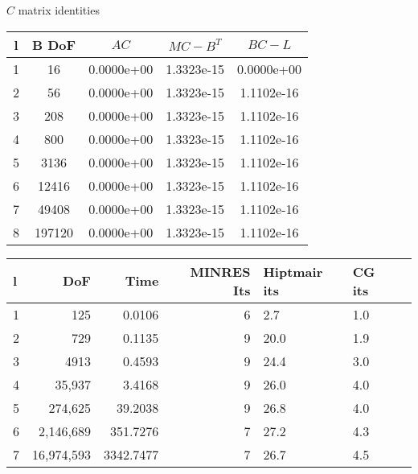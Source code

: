 \documentclass{article}
\begin{document}
$C$ matrix identities

\begin{tabular}{ccccc}
\hline
 l &   B DoF &        $AC$ &    $MC-B^T$ &      $BC-L$ \\
\hline
   1 &      16 &  0.0000e+00 &  1.3323e-15 &  0.0000e+00 \\
   2 &      56 &  0.0000e+00 &  1.3323e-15 &  1.1102e-16 \\
   3 &     208 &  0.0000e+00 &  1.3323e-15 &  1.1102e-16 \\
   4 &     800 &  0.0000e+00 &  1.3323e-15 &  1.1102e-16 \\
   5 &    3136 &  0.0000e+00 &  1.3323e-15 &  1.1102e-16 \\
   6 &   12416 &  0.0000e+00 &  1.3323e-15 &  1.1102e-16 \\
   7 &   49408 &  0.0000e+00 &  1.3323e-15 &  1.1102e-16 \\
   8 &  197120 &  0.0000e+00 &  1.3323e-15 &  1.1102e-16 \\
\hline
\end{tabular}



\begin{tabular}{lrrrlll}
\hline
  l &       DoF &       Time & MINRES Its & Hiptmair its & CG its \\
\hline
  1 &       125 &     0.0106 &          6 &          2.7 &    1.0 \\
  2 &       729 &     0.1135 &          9 &         20.0 &    1.9 \\
  3 &      4913 &     0.4593 &          9 &         24.4 &    3.0 \\
  4 &     35,937 &     3.4168 &          9 &         26.0 &    4.0 \\
  5 &    274,625 &    39.2038 &          9 &         26.8 &    4.0 \\
  6 &   2,146,689 &   351.7276 &          7 &         27.2 &    4.3 \\
  7 &  16,974,593 &  3342.7477 &          7 &         26.7 &    4.5 \\
\hline
\end{tabular}
\end{document}
